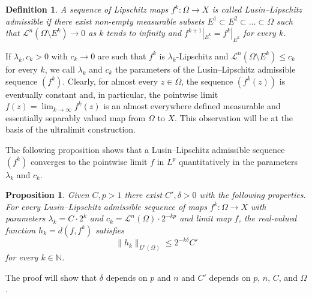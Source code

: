 \documentclass[a4paper,leqno]{amsart}
\numberwithin{equation}{section}
\newtheorem{proposition}[theorem]{Proposition}
\newtheorem{definition}[theorem]{Definition}
\theoremstyle{remark}
\theoremstyle{remark}
\newcommand{\N}{\mathbb{N}}
\newcommand{\lm}{\mathscr{L}}
\begin{document}
\begin{definition}\label{definition-lusin-lipschitz-admissible-sequence}
  A sequence of Lipschitz maps $f^k\colon \Omega\to X$ is called Lusin--Lipschitz admissible if there exist non-empty measurable subsets $E^1\subset E^2\subset \dots\subset\Omega$ such that $\lm^n(\Omega\setminus E^k)\to 0$ as $k$ tends to infinity and $f^{k+1}|_{E^k} = f^k|_{E^k}$ for every $k$.
\end{definition}

If $\lambda_k, c_k>0$ with $c_k\to 0$ are such that $f^k$ is $\lambda_k$-Lipschitz and $\lm^n(\Omega\setminus E^k)\leq c_k$ for every $k$, we call $\lambda_k$ and $c_k$ the parameters of the Lusin--Lipschitz admissible sequence $(f^k)$. Clearly, for almost every $z\in\Omega$, the sequence $(f^k(z))$ is eventually constant and, in particular, the pointwise limit $f(z)= \lim_{k\to\infty} f^k(z)$ is an almost everywhere defined measurable and essentially separably valued map from $\Omega$ to $X$. This observation will be at the basis of the ultralimit construction.


The following proposition shows that a Lusin--Lipschitz admissible sequence $( f^k )$ converges to the pointwise limit $f$ in $L^p$ quantitatively in the parameters $\lambda_k$ and $c_k$.



\begin{proposition}\label{prop:distance-admissible-sequence-limit}
   Given $C,p>1$ there exist $C',\delta>0$ with the following properties. For every Lusin--Lipschitz admissible sequence of maps $f^k\colon\Omega\to X$ with parameters $\lambda_k= C\cdot 2^k$ and $c_k= \lm^n(\Omega) \cdot 2^{-kp}$ and limit map $f$, the real-valued function $h_k= d(f,f^k)$ satisfies $$\|h_k\|_{L^p(\Omega)} \leq 2^{-k\delta}C'$$ for every $k\in\N$.
\end{proposition}

The proof will show that $\delta$ depends on $p$ and $n$ and $C'$ depends on $p$, $n$, $C$, and $\Omega$.
\end{document}
